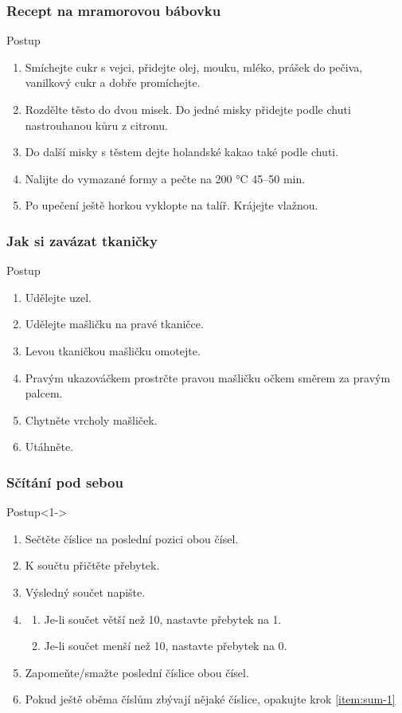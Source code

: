 \documentclass[aspectratio=169,11pt]{beamer}
\begin{document}
\begin{frame}
 \frametitle{Recept na mramorovou bábovku}
 \begin{block}{Postup}
  \begin{enumerate}
   \item Smíchejte cukr s vejci, přidejte olej, mouku, mléko, prášek do pečiva,
    vanilkový cukr a dobře promíchejte.
   \item Rozdělte těsto do dvou misek. Do jedné misky přidejte podle chuti
    nastrouhanou kůru z citronu.
   \item Do další misky s těstem dejte holandské kakao také podle chuti.
   \item Nalijte do vymazané formy a pečte na 200 °C 45–50 min.
   \item Po upečení ještě horkou vyklopte na talíř. Krájejte vlažnou.
  \end{enumerate}
 \end{block}
\end{frame}

\begin{frame}
 \frametitle{Jak si zavázat tkaničky}
 \begin{block}{Postup}
  \begin{enumerate}
   \item Udělejte uzel.
   \item Udělejte mašličku na pravé tkaničce.
   \item Levou tkaničkou mašličku omotejte.
   \item Pravým ukazováčkem prostrčte pravou mašličku očkem směrem za pravým
    palcem.
   \item Chytněte vrcholy mašliček.
   \item Utáhněte.
  \end{enumerate}
 \end{block}
\end{frame}

\begin{frame}
 \frametitle{Sčítání pod sebou}
 \begin{block}{Postup}<1->
  \begin{enumerate}
   \item<2->\label{item:sum-1} Sečtěte číslice na poslední pozici obou čísel.
   \item<3-> K součtu přičtěte přebytek.
   \item<4-> Výsledný součet napište.
   \item<5-> 
    \begin{enumerate}
     \item Je-li součet větší než 10, nastavte přebytek na 1.
     \item Je-li součet menší než 10, nastavte přebytek na 0.
    \end{enumerate}
   \item<6-> Zapomeňte/smažte poslední číslice obou čísel.
   \item<7-> Pokud ještě oběma číslům zbývají nějaké číslice, opakujte krok
    \ref{item:sum-1}
  \end{enumerate}
 \end{block}
\end{frame}
\end{document}
